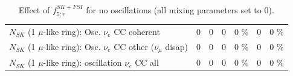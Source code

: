 \begin{table}
\begin{tabular}{| l | r | r | r  r | r  r |}
                          $N_{SK}$ (1 $\mu$-like ring): Osc. $\nu_e$ CC coherent &               0 &               0 &               0 &        0 \%  &               0 &        0 \%  \\ 
           $N_{SK}$ (1 $\mu$-like ring): Osc. $\nu_e$ CC other ($\nu_\mu$ disap) &               0 &               0 &               0 &        0 \%  &               0 &        0 \%  \\ 
                        $N_{SK}$ (1 $\mu$-like ring): oscillation $\nu_e$ CC all &               0 &               0 &               0 &        0 \%  &               0 &        0 \%  \\ 
\hline
\hline
\end{tabular}
\caption{ Effect of $f_{5; r}^{SK+FSI}$ for no oscillations (all mixing parameters set to 0). }
\label{tab:num_skdetfsi_005_1RmuT_3f_osc_t13:0_spectralreco_spectraltrue}
\end{table}
\clearpage

